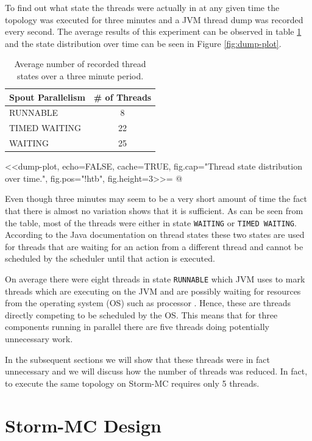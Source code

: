 To find out what state the threads were actually in at any given time the topology was executed for three minutes and a JVM thread dump was recorded every second. The average results of this experiment can be observed in table \ref{table:dump} and the state distribution over time can be seen in Figure \ref{fig:dump-plot}.

\begin{table}[htb!]
\centering
\small
\begin{tabular}{@{}lc@{}}
    \textbf{Spout Parallelism} & \textbf{\# of Threads} \\ \toprule
    RUNNABLE & 8  \\
	TIMED WAITING & 22  \\
    WAITING & 25  \\
\end{tabular}
\caption{Average number of recorded thread states over a three minute period.}
\label{table:dump}
\end{table}

<<dump-plot, echo=FALSE, cache=TRUE, fig.cap="Thread state distribution over time.", fig.pos="!htb", fig.height=3>>=
@

Even though three minutes may seem to be a very short amount of time the fact that there is almost no variation shows that it is sufficient. As can be seen from the table, most of the threads were either in state \texttt{WAITING} or \texttt{TIMED WAITING}. According to the Java documentation on thread states \citep{JavaThreads} these two states are used for threads that are waiting for an action from a different thread and cannot be scheduled by the scheduler until that action is executed.

On average there were eight threads in state \texttt{RUNNABLE} which JVM uses to mark threads which are executing on the JVM and are possibly waiting for resources from the operating system (OS) such as processor \citep{JavaThreads}. Hence, these are threads directly competing to be scheduled by the OS. This means that for three components running in parallel there are five threads doing potentially unnecessary work.

In the subsequent sections we will show that these threads were in fact unnecessary and we will discuss how the number of threads was reduced. In fact, to execute the same topology on Storm-MC requires only 5 threads.

\section{Storm-MC Design}
\label{sec:storm_mc_arch}

